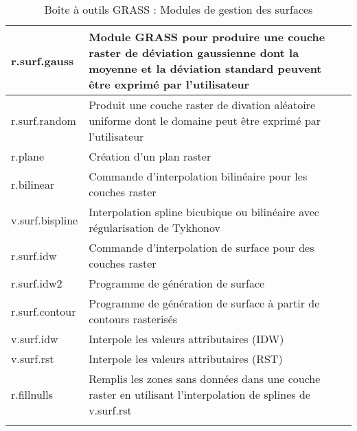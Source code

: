 \begin{center}
{\begin{longtable}{|p{4cm}|p{10cm}|}
  \hline r.surf.gauss & Module GRASS pour produire une couche raster de déviation gaussienne dont la moyenne et la déviation standard peuvent \^etre exprimé par l'utilisateur\\
  \hline r.surf.random & Produit une couche raster de divation aléatoire uniforme dont le domaine peut \^etre exprimé par l'utilisateur\\
  \hline r.plane & Création d'un plan raster \\  
  \hline r.bilinear & Commande d'interpolation bilinéaire pour les couches raster \\
  \hline v.surf.bispline & Interpolation spline bicubique ou bilinéaire avec régularisation de Tykhonov \\
  \hline r.surf.idw & Commande d'interpolation de surface pour des couches raster\\
  \hline r.surf.idw2 & Programme de génération de surface\\
  \hline r.surf.contour & Programme de génération de surface à partir de contours rasterisés \\
  \hline v.surf.idw & Interpole les valeurs attributaires (IDW) \\
  \hline v.surf.rst & Interpole les valeurs attributaires (RST) \\
  \hline r.fillnulls & Remplis les zones sans données dans une couche raster en utilisant l'interpolation de splines de v.surf.rst \\
\hline
\caption{Boîte à outils GRASS : Modules de gestion des surfaces}
\end{longtable}}
\end{center} 

